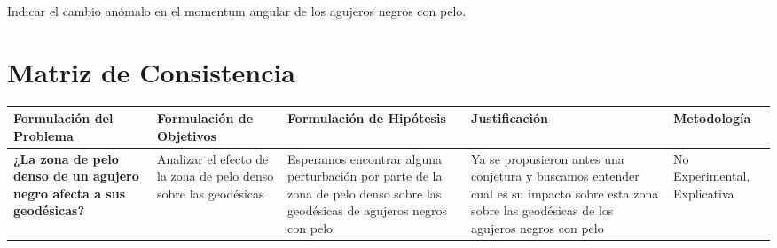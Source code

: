 \documentclass[../Main.tex]{subfiles}
\begin{document}
Indicar el cambio anómalo en el momentum angular de los agujeros negros con pelo.
\section{Matriz de Consistencia}

\begin{table}[!ht]
\begin{center}
\begin{tabular}{| m{5em} | m{5em} | m{5em} | m{5em} | m{5em} |}
\hline
Formulación del Problema & Formulación de Objetivos & Formulación de Hipótesis & Justificación & Metodología \\
\hline \hline
\textbf{¿La zona de pelo denso de un agujero negro afecta a sus geodésicas?} & Analizar el efecto de la zona de pelo denso sobre las geodésicas & Esperamos encontrar alguna perturbación por parte de la zona de pelo denso sobre las geodésicas de agujeros negros con pelo & Ya se propusieron antes una conjetura y buscamos entender cual es su impacto sobre esta zona sobre las geodésicas de los agujeros negros con pelo & No Experimental, Explicativa \\
\hline
\end{tabular}
\end{center}
\end{table}

\biblio %
\end{document}
